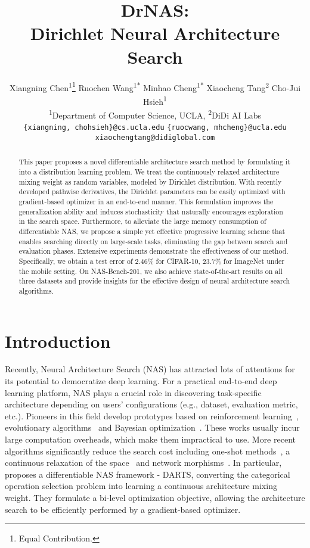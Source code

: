 \documentclass{article} \usepackage{iclr2021_conference,times}
\title{DrNAS: \\
Dirichlet Neural Architecture Search}
\author{
Xiangning Chen\textsuperscript{1}\thanks{Equal Contribution.}
\enskip Ruochen Wang\textsuperscript{1}\textsuperscript{$\ast$}
\enskip Minhao Cheng\textsuperscript{1}\textsuperscript{$\ast$}
\enskip Xiaocheng Tang\textsuperscript{2}
\enskip Cho-Jui Hsieh\textsuperscript{1}\\
\textsuperscript{1}Department of Computer Science, UCLA, \enskip \textsuperscript{2}DiDi AI Labs\\
\small{\texttt{\{xiangning, chohsieh\}@cs.ucla.edu}} \quad \small{\texttt{\{ruocwang, mhcheng\}@ucla.edu}}\\
\small{\texttt{xiaochengtang@didiglobal.com}}
}
\begin{document}
\maketitle

\begin{abstract}
This paper proposes a novel differentiable architecture search method by formulating it into a distribution learning problem. We treat the continuously relaxed architecture mixing weight as random variables, modeled by Dirichlet distribution. With recently developed pathwise derivatives, the Dirichlet parameters can be easily optimized with gradient-based optimizer in an end-to-end manner. This formulation improves the generalization ability and induces stochasticity that naturally encourages exploration in the search space. Furthermore, to alleviate the large memory consumption of differentiable NAS, we propose a simple yet effective progressive learning scheme that enables searching directly on large-scale tasks, eliminating the gap between search and evaluation phases. Extensive experiments demonstrate the effectiveness of our method. Specifically, we obtain a test error of 2.46\% for CIFAR-10, 23.7\% for ImageNet under the mobile setting. On NAS-Bench-201, we also achieve state-of-the-art results on all three datasets and provide insights for the effective design of neural architecture search algorithms.
\end{abstract}



\section{Introduction}
Recently, Neural Architecture Search (NAS) has attracted lots of attentions for its potential to democratize deep learning. For a practical end-to-end deep learning platform, NAS plays a crucial role in discovering task-specific architecture depending on users' configurations (e.g., dataset, evaluation metric, etc.).
Pioneers in this field develop prototypes based on reinforcement learning~\citep{nas}, evolutionary algorithms~\citep{amoebanet} and Bayesian optimization~\citep{pnas}. These works usually incur large computation overheads, which make them impractical to use.
More recent algorithms significantly reduce the search cost including one-shot methods~\citep{enas, oneshot}, a continuous relaxation of the space~\citep{darts} and network morphisms~\citep{morphisms}. 
In particular,~\citet{darts} proposes a differentiable NAS framework - DARTS, converting the categorical operation selection problem into learning a continuous architecture mixing weight. They formulate a bi-level optimization objective, allowing the architecture search to be efficiently performed by a gradient-based optimizer.
\end{document}
